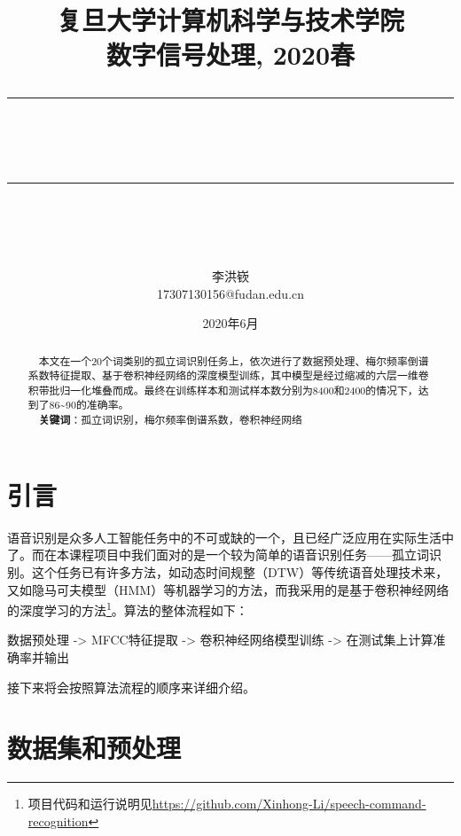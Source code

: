 \documentclass[12pt]{article} %
\newcommand{\horrule}[1]{\rule[0.5ex]{\linewidth}{#1}} 	%
\begin{document}
\title{
{\normalfont\normalsize\textsc{
复旦大学计算机科学与技术学院\\
数字信号处理, 2020春 \\[25pt]}}
\horrule{1.8pt}\\
\horrule{1.8pt}\\[20pt]
}
\author{李洪嵚 \\17307130156@fudan.edu.cn}
\date{2020年6月} %

\begin{titlepage}
\maketitle
\vspace{30pt}
\begin{abstract}
\normalsize \ \ 本文在一个20个词类别的孤立词识别任务上，依次进行了数据预处理、梅尔频率倒谱系数特征提取、基于卷积神经网络的深度模型训练，其中模型是经过缩减的六层一维卷积带批归一化堆叠而成。最终在训练样本和测试样本数分别为8400和2400的情况下，达到了86\textasciitilde90的准确率。\\[5pt]
\indent \ \ \textbf{关键词}：孤立词识别，梅尔频率倒谱系数，卷积神经网络
\end{abstract}
\thispagestyle{empty}
\end{titlepage}

\tableofcontents
\thispagestyle{empty}

\newpage
\setcounter{page}{1}

\section{引言}
语音识别是众多人工智能任务中的不可或缺的一个，且已经广泛应用在实际生活中了。而在本课程项目中我们面对的是一个较为简单的语音识别任务——孤立词识别。这个任务已有许多方法，如动态时间规整（DTW）等传统语音处理技术来，又如隐马可夫模型（HMM）等机器学习的方法，而我采用的是基于卷积神经网络的深度学习的方法\footnote{项目代码和运行说明见\url{https://github.com/Xinhong-Li/speech-command-recognition}}。算法的整体流程如下：


数据预处理 -> MFCC特征提取 -> 卷积神经网络模型训练 -> 在测试集上计算准确率并输出

接下来将会按照算法流程的顺序来详细介绍。

\section{数据集和预处理}
\end{document}
